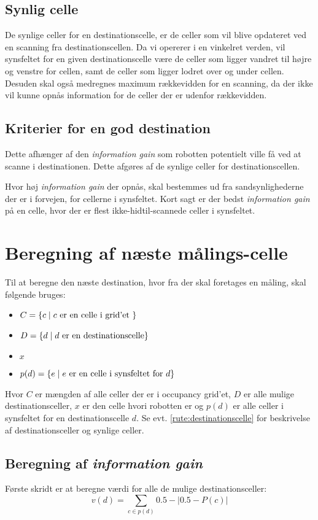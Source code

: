\subsection{Synlig celle}\label{rute:synligcelle}
De synlige celler for en destinationscelle, er de celler som vil blive opdateret ved en scanning fra destinationscellen.
Da vi opererer i en vinkelret verden, vil synsfeltet for en given destinationscelle være de celler som ligger vandret til højre og venstre for cellen, samt de celler som ligger lodret over og under cellen.
Desuden skal også medregnes maximum rækkevidden for en scanning, da der ikke vil kunne opnås information for de celler der er udenfor rækkevidden.

\subsection{Kriterier for en god destination}
Dette afhænger af den \textit{information gain} som robotten potentielt ville få ved at scanne i destinationen.
Dette afgøres af de synlige celler for destinationscellen.

Hvor høj \textit{information gain} der opnås, skal bestemmes ud fra sandsynlighederne der er i forvejen, for cellerne i synsfeltet.
Kort sagt er der bedst \textit{information gain} på en celle, hvor der er flest ikke-hidtil-scannede celler i synsfeltet.

\section{Beregning af næste målings-celle}
Til at beregne den næste destination, hvor fra der skal foretages en måling, skal følgende bruges:
\begin{itemize}
\item{$C = \{ c \mid c \textnormal{ er en celle i grid'et } \}$}
\item{$D = \{ d \mid d \textnormal{ er en destinationscelle}\}$}
\item{$x$}
\item{$p(d) = \{ e \mid e \textnormal{ er en celle i synsfeltet for } d \}$}
\end{itemize}
Hvor $C$ er mængden af alle celler der er i occupancy grid'et, $D$ er alle mulige destinationsceller, $x$ er den celle hvori robotten er og $p(d)$ er alle celler i synsfeltet for en destinationscelle $d$.
Se evt. \cref{rute:destinationscelle} for beskrivelse af destinationsceller og synlige celler.

\subsection{Beregning af \textit{information gain}}
Første skridt er at beregne værdi for alle de mulige destinationsceller:
\begin{equation}
v(d) = \sum_{c \in p(d)} 0.5-|0.5 - P(c)|
\end{equation}

